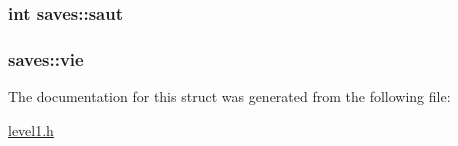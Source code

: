 \subsubsection[{\texorpdfstring{saut}{saut}}]{\setlength{\rightskip}{0pt plus 5cm}int saves\+::saut}\hypertarget{structsaves_a57efa80fe293ed60438a596d1f42c3b0}{}\label{structsaves_a57efa80fe293ed60438a596d1f42c3b0}
\subsubsection[{\texorpdfstring{vie}{vie}}]{ saves\+::vie}\hypertarget{structsaves_ad07a79adf13feb4ffe0f035724ddb04b}{}\label{structsaves_ad07a79adf13feb4ffe0f035724ddb04b}


The documentation for this struct was generated from the following file\+:\begin{DoxyCompactItemize}
\item 
\hyperlink{level1_8h}{level1.\+h}\end{DoxyCompactItemize}
